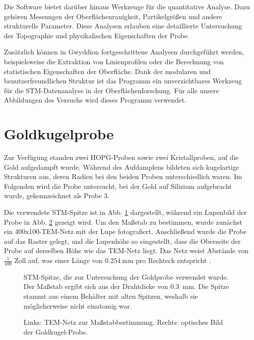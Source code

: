 \documentclass{article}
\newcommand{\defc}{black}
\newcommand{\colorT}[2][blue]{\color{#1}{#2}\color{\defc}}
\newcommand{\todo}[1]{\colorT[red]{\textbf{(#1)}}}
\begin{document}
Die Software bietet darüber hinaus Werkzeuge für die quantitative Analyse. Dazu gehören Messungen der Oberflächenrauigkeit, Partikelgrößen und andere strukturelle Parameter. Diese Analysen erlauben eine detaillierte Untersuchung der Topographie und physikalischen Eigenschaften der Probe.

Zusätzlich können in Gwyddion fortgeschrittene Analysen durchgeführt werden, beispielsweise die Extraktion von Linienprofilen oder die Berechnung von statistischen Eigenschaften der Oberfläche. Dank der modularen und benutzerfreundlichen Struktur ist das Programm ein unverzichtbares Werkzeug für die STM-Datenanalyse in der Oberflächenforschung. Für alle unsere Abbildungen des Versuchs wird dieses Programm verwendet.

\section{Goldkugelprobe}

Zur Verfügung standen zwei HOPG-Proben sowie zwei Kristallproben, auf die Gold aufgedampft wurde. Während des Aufdampfens bildeten sich kugelartige Strukturen aus, deren Radien bei den beiden Proben unterschiedlich waren. Im Folgenden wird die Probe untersucht, bei der Gold auf Silizium aufgebracht wurde, gekennzeichnet als Probe 3.

Die verwendete STM-Spitze ist in Abb. \ref{fig:spitze-1} dargestellt, während ein Lupenbild der Probe in Abb. \ref{fig:goldkugel-lupe} gezeigt wird. Um den Maßstab zu bestimmen, wurde zunächst ein 400x100-TEM-Netz mit der Lupe fotografiert. Anschließend wurde die Probe auf das Raster gelegt, und die Lupenhöhe so eingestellt, dass die Oberseite der Probe auf derselben Höhe wie das TEM-Netz liegt. Das Netz weist Abstände von $\frac{1}{100}$ Zoll auf, was einer Länge von $\SI{0.254}{\mm}$ pro Rechteck entspricht \cite{meshsize}.

\begin{figure}[h!]
    \centering
    \caption{STM-Spitze, die zur Untersuchung der Goldprobe verwendet wurde. Der Maßstab ergibt sich aus der Drahtdicke von \SI{0.3}{\mm}. Die Spitze stammt aus einem Behälter mit alten Spitzen, weshalb sie möglicherweise nicht einatomig war.}
    \label{fig:spitze-1}
\end{figure}
\newpage
\begin{figure}[h!]
    \centering
    \hfill
    \caption{Links: TEM-Netz zur Maßstabbestimmung. Rechts: optisches Bild der Goldkugel-Probe.}
    \label{fig:goldkugel-lupe}
\end{figure}
\end{document}
